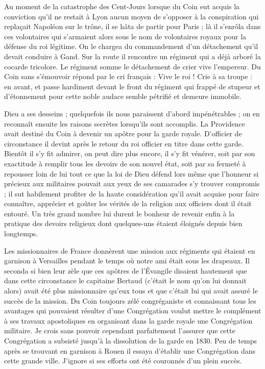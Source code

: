 Au moment de la catastrophe des Cent-Jours lorsque du Coin eut acquis la conviction qu'il ne restait à Lyon aucun moyen de s'opposer à la conspiration qui replaçait Napoléon sur le trône, il se hâta de partir pour Paris ; là il s'enrôla dans ces volontaires qui s'armaient alors sous le nom de volontaires royaux pour la défense du roi légitime. On le chargea du commandement d'un détachement qu'il devait conduire à Gand. Sur la route il rencontre un régiment qui a déjà arboré la cocarde tricolore. Le régiment somme le détachement de crier vive l'empereur. Du Coin sans s'émouvoir répond par le cri français : Vive le roi ! Crie
à sa troupe : en avant, et passe hardiment devant le front du régiment qui frappé de stupeur et d'étonnement pour cette noble audace semble pétrifié et demeure immobile.

Dieu a ses desseins ; quelquefois ils nous paraissent d'abord impénétrables ; on en reconnaît ensuite les raisons secrètes lorsqu'ils sont accomplis. La Providence avait destiné du Coin à devenir un apôtre pour la garde royale. D'officier de circonstance il devint après le retour du roi officier en titre dans cette garde. Bientôt il s'y fit admirer, on peut dire plus encore, il s'y fit vénérer, soit par son exactitude à remplir tous les devoirs de son nouvel état, soit par sa fermeté à repousser loin de lui tout ce que la loi de Dieu défend lors même que l'honneur si précieux aux militaires pouvait aux yeux de ses camarades s'y trouver compromis ; il sut habilement profiter de la haute considération qu'il avait acquise pour faire connaître, apprécier et goûter les vérités de la religion aux officiers dont il était entouré. Un très grand nombre lui durent le bonheur de revenir enfin à la pratique des devoirs religieux dont quelques-uns étaient éloignés depuis bien longtemps.

Les missionnaires de France donnèrent une mission aux régiments qui étaient en garnison à Versailles pendant le temps où notre ami était sous les drapeaux. Il seconda si bien leur zèle que ces apôtres de l'Évangile disaient hautement que dans cette circonstance le capitaine Bertaud (c'était le nom qu'on lui donnait alors) avait été plus missionnaire qu'eux tous et que c'était lui qui avait assuré le succès de la mission. Du Coin toujours zélé congréganiste et connaissant
tous les avantages qui pouvaient résulter d'une Congrégation voulut mettre le complément à ses travaux apostoliques en organisant dans la garde royale une Congrégation militaire. Je crois sans pouvoir cependant parfaitement l'assurer que cette Congrégation a subsisté jusqu'à la dissolution de la garde en 1830. Peu de temps après se trouvant en garnison à Rouen il essaya d'établir une Congrégation dans cette grande ville. J'ignore si ses efforts ont été couronnés d'un plein succès.


